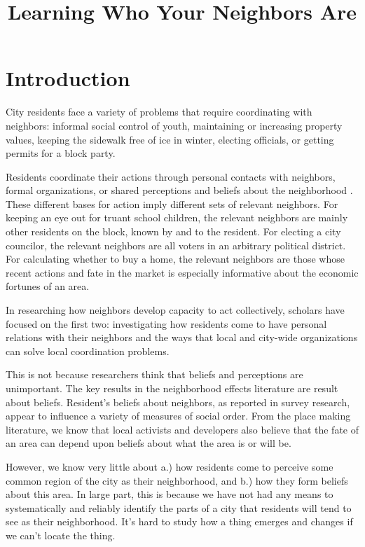 \documentclass[12pt,letter]{article}\usepackage[]{graphicx}\usepackage[]{color}
\title{Learning Who Your Neighbors Are}
\date{}
\author{}
\let\cite=\citep
\begin{document}
\maketitle







\section*{Introduction}
City residents face a variety of problems that require coordinating
with neighbors: informal social control of youth, maintaining or
increasing property values, keeping the sidewalk free of ice 
in winter, electing officials, or getting permits for a block party. 

Residents coordinate their actions through personal contacts with
neighbors, formal organizations, or shared perceptions and beliefs
about the neighborhood \cite{needed}. These different bases for action imply
different sets of relevant neighbors. For keeping an eye out for
truant school children, the relevant neighbors are mainly other
residents on the block, known by and to the resident. For electing a
city councilor, the relevant neighbors are all voters in an arbitrary
political district. For calculating whether to buy a home, the
relevant neighbors are those whose recent actions and fate in the
market is especially informative about the economic fortunes of an
area.

In researching how neighbors develop capacity to act collectively,
scholars have focused on the first two: investigating how residents
come to have personal relations with their neighbors and the ways that
local and city-wide organizations can solve local coordination
problems.

This is not because researchers think that beliefs and perceptions are
unimportant. The key results in the neighborhood effects literature
are result about beliefs. Resident's beliefs about neighbors, as
reported in survey research, appear to influence a variety of measures
of social order. From the place making literature, we know that local
activists and developers also believe that the fate of an area can
depend upon beliefs about what the area is or will be.

However, we know very little about a.) how residents come to perceive some
common region of the city as their neighborhood, and b.) how they form
beliefs about this area. In large part, this is because we have not
had any means to systematically and reliably identify the parts of a
city that residents will tend to see as their neighborhood. It's hard
to study how a thing emerges and changes if we can't locate the thing.
\end{document}

